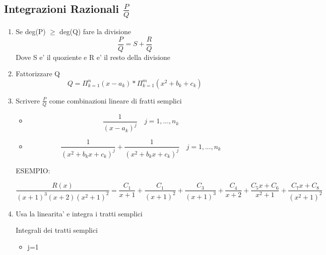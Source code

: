 \documentclass{article}
\begin{document}
          \subsection{Integrazioni Razionali $\frac{P}{Q}$}
          \begin{enumerate}
            \item Se deg(P) $\geq$ deg(Q) fare la divisione
              \begin{equation}
                \frac{P}{Q}=S+\frac{R}{Q}
              \end{equation}
              Dove S e' il quoziente e R e' il resto della divisione
            \item Fattorizzare Q
              \begin{equation}
                Q=\Pi_{k=1}^n(x-a_k)*\Pi_{k=1}^m(x^2+b_k+c_k)
              \end{equation}
            \item Scrivere $\frac{P}{Q}$ come combinazioni lineare di fratti semplici
              \begin{itemize}
                \item 
                  \begin{equation*}
                    \frac{1}{(x-a_k)^j} \quad j=1,...,n_k
                  \end{equation*}
                \item 
                  \begin{equation*}
                    \frac{1}{(x^2+b_kx+c_k)^j}+\frac{1}{(x^2+b_kx+c_k)^j} \quad j=1,...,n_k
                  \end{equation*}
              \end{itemize}
              \begin{flushleft}
                ESEMPIO:
              \end{flushleft}
              \begin{equation*}
                \frac{R(x)}{(x+1)^3(x+2)(x^2+1)^2}=\frac{C_1}{x+1}+\frac{C_1}{(x+1)^2}+\frac{C_3}{(x+1)^3}+\frac{C_4}{x+2}+\frac{C_5x+C_6}{x^2+1}+\frac{C_7x+C_8}{(x^2+1)^2}
              \end{equation*}
            \item Usa la linearita' e integra i tratti semplici
              \begin{flushleft}
                Integrali dei tratti semplici
              \end{flushleft}
              \begin{itemize}
                \item j=1 

\end{itemize}
\end{enumerate}
\end{document}
